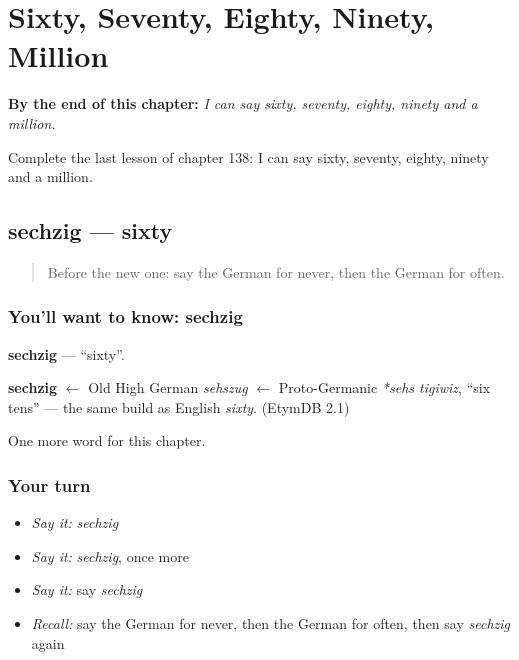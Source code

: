 
\chapter{Sixty, Seventy, Eighty, Ninety, Million}
\label{ch:ge-sixty-seventy-eighty-ninety-million}

\begin{chapteropening}
\textbf{By the end of this chapter:} \emph{I can say sixty, seventy, eighty, ninety and a million.}

Complete the last lesson of chapter 138: I can say sixty, seventy, eighty, ninety and a million.
\end{chapteropening}

\section[sechzig]{sechzig — sixty}

\label{lesson:GE-C138-sechzig}



\begin{quote}
Before the new one: say the German for never, then the German for often.
\end{quote}

\subsection*{You'll want to know: sechzig}
\textbf{sechzig} — \textquotedblleft{}sixty\textquotedblright{}.

\begin{cousinweb}
\textbf{sechzig} $\leftarrow$ Old High German \emph{sehszug} $\leftarrow$ Proto-Germanic \emph{*sehs tigiwiz}, \textquotedblleft{}six tens\textquotedblright{} — the same build as English \emph{sixty}. (EtymDB 2.1)
\end{cousinweb}

\begin{grammarlens}[title={What you've built}]
One more word for this chapter.
\end{grammarlens}

\subsection*{Your turn}
\begin{itemize}
\raggedright
  \item \emph{Say it:} \emph{sechzig}
  \item \emph{Say it:} \emph{sechzig}, once more
  \item \emph{Say it:} say \emph{sechzig}
  \item \emph{Recall:} say the German for never, then the German for often, then say \emph{sechzig} again
\end{itemize}

